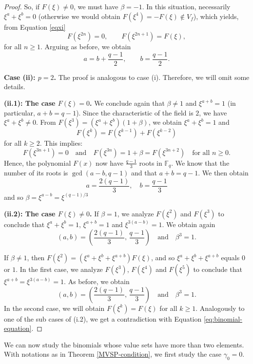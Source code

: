 \documentclass[preprint,12pt]{elsarticle}
\begin{document}
\begin{proof}
  So, if $F(\xi) \neq 0$, we must have $\beta = -1$. In this situation, necessarily $\xi^a+\xi^b=0$ (otherwise we would obtain $F(\xi^4) = - F(\xi) \notin V_f$), which yields, from Equation \eqref{eqxi}
\[
F(\xi^{2n})=0, \qquad F(\xi^{2n+1})=F(\xi),
\]
for all $n\ge1$. Arguing as before, we obtain
\[
a = b + \frac{q-1}{2}, \qquad b = \frac{q-1}{2}.
\]

\medskip

\noindent
\textbf{Case (ii): $p = 2$.} The proof is analogous to case (i). Therefore, we will omit some details.

\noindent
\textbf{(ii.1): The case $F(\xi) = 0$.} We conclude again that $\beta \neq 1$ and $\xi^{a+b} = 1$ (in particular, $a + b = q - 1$). Since the characteristic of the field is $2$, we have $\xi^a + \xi^b \neq 0$. From $F(\xi^3) = (\xi^a + \xi^b)(1 + \beta)$, we obtain $\xi^a + \xi^b = 1$ and
$$F(\xi^k) = F(\xi^{k - 1}) + F(\xi^{k - 2})$$
for all $k \geq 2$. This implies:
$$F(\xi^{3n + 1}) = 0 \quad \text{and} \quad F(\xi^{3n}) = 1 + \beta = F(\xi^{3n+2}) \quad \text{for all } n \geq 0.$$
Hence, the polynomial $F(x)$ now have $\frac{q-1}{3}$ roots in $\mathbb{F}_q$. We know that the number of its roots is $\gcd(a - b, q - 1)$ and that $a + b = q - 1$. We then obtain
$$a = \frac{2(q - 1)}{3}, \quad b = \frac{q - 1}{3}$$
and so $\beta = \xi^{a - b} = \xi^{(q-1)/3}$

\smallskip

\noindent
\textbf{(ii.2): The case $F(\xi) \neq 0$.} If $\beta = 1$, we analyze $F(\xi^2)$ and $F(\xi^3)$ to conclude that $\xi^a + \xi^b = 1$, $\xi^{a+b} = 1$ and $\xi^{3(a - b)} = 1$. We obtain again 
$$(a, b) = \left( \frac{2(q - 1)}{3},\, \frac{q - 1}{3} \right) \quad \textrm{and} \quad  \beta^3 = 1.$$

If $\beta \neq 1$, then $F(\xi^2) = (\xi^a + \xi^b + \xi^{a+b})F(\xi)$, and so $\xi^a + \xi^b + \xi^{a+b}$ equals $0$ or $1$. In the first case, we analyze $F(\xi^3)$, $F(\xi^4)$ and $F(\xi^5)$ to conclude that $\xi^{a+b} = \xi^{3(a - b)} = 1$. As before, we obtain
$$(a, b) = \left( \frac{2(q - 1)}{3},\, \frac{q - 1}{3} \right) \quad \textrm{and} \quad  \beta^3 = 1.$$
In the second case, we will obtain $F(\xi^k) = F(\xi)$ for all $k \geq 1$. Analogously to one of the sub cases of (i.2), we get a contradiction with Equation \eqref{eq:binomial-equation}.
\end{proof}

We can now study the binomials whose value sets have more than two elements. With notations as in Theorem \ref{MVSP-condition}, we first study the case $\gamma_0 = 0$.
\end{document}
